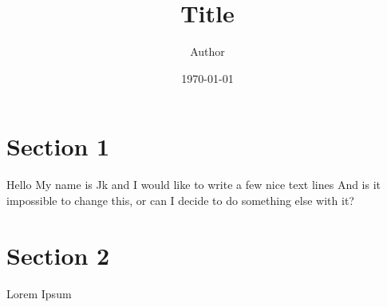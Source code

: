\documentclass[11pt]{article}
\title{ Title}
\author{ Author }
\date{\today}
\begin{document}
\maketitle	
\pagebreak



\section{Section 1}

Hello My name is Jk and I would like to write a few nice text lines And is it impossible to change this, or can I decide to do something else with it?


\pagebreak
\section{Section 2}
Lorem Ipsum \\

\end{document}
